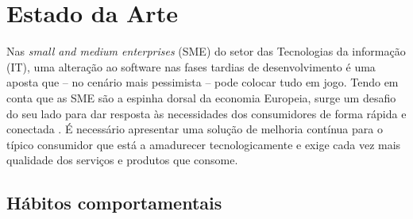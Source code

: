 \chapter{Estado da Arte}
\label{Ch:EstadoDaArte}
\hspace{1cm}Nas \textit{small and medium enterprises} (SME) do setor das Tecnologias da informação (IT), uma alteração ao software nas fases tardias de desenvolvimento é uma aposta que -- no cenário mais pessimista -- pode colocar tudo em jogo. Tendo em conta que as SME são a espinha dorsal da economia Europeia, surge um desafio do seu lado para dar resposta às necessidades dos consumidores de forma rápida e conectada \cite{dunne2015social}. É necessário apresentar uma solução de melhoria contínua para o típico consumidor que está a amadurecer tecnologicamente e exige cada vez mais qualidade dos serviços e produtos que consome.

\section{Hábitos comportamentais}


